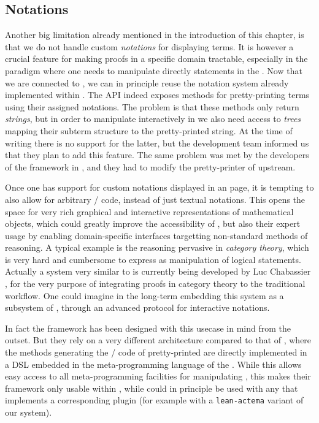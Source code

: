\subsection{Notations}

Another big limitation already mentioned in the introduction of this chapter, is
that we do not handle custom \emph{notations} for displaying
terms. It is however a crucial feature for making proofs in a specific
domain tractable, especially in the  paradigm where one needs to
manipulate directly statements in the . Now that we are connected to
, we can in principle reuse the notation system already implemented
within . The   API indeed exposes methods for
pretty-printing  terms using their assigned notations. The problem is
that these methods only return \emph{strings}, but in order to manipulate
 interactively in  we also need access to \emph{trees}
mapping their subterm structure to the pretty-printed string. At the time of
writing there is no support for the latter, but the  development team
informed us that they plan to add this feature. The same problem was met by the
developers of the  framework in , and they had to
modify the pretty-printer of  upstream.

Once one has support for custom notations displayed in an  page, it is
tempting to also allow for arbitrary / code, instead of just
textual notations. This opens the space for very rich graphical and interactive
representations of mathematical objects, which could greatly improve the
accessibility of , but also their expert usage by enabling
domain-specific interfaces targetting non-standard methods of reasoning. A
typical example is the \emph{} reasoning pervasive in
\emph{category theory}, which is very hard and cumbersome to express as
manipulation of logical statements. Actually a system very similar to
 is currently being developed by Luc Chabassier \cite{LucTalk},
for the very purpose of integrating  proofs in category theory
to the traditional  workflow. One could imagine in the
long-term embedding this system as a subsystem of , through an
advanced protocol for interactive notations.

In fact the  framework has been designed with this usecase in
mind from the outset. But they rely on a very different architecture compared to
that of , where the methods generating the / code
of pretty-printed  are directly implemented in a DSL embedded in the
meta-programming language of the . While this allows easy access to all
meta-programming facilities for manipulating , this makes their
framework only usable within , while  could in principle be
used with any  that implements a corresponding plugin (for example with a
\texttt{lean-actema} variant of our system).

